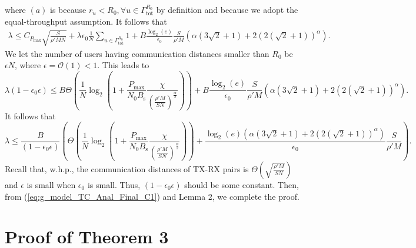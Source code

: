 \documentclass[journal,draftclsnofoot,onecolumn,12pt,twoside]{IEEEtran}
\begin{document}
where $(a)$ is because $r_u<R_0,\forall u\in\Gamma^{R_0}_{\text{tot}}$ by definition and because we adopt the equal-throughput assumption. It follows that 
\begin{equation}
\begin{aligned}
\lambda\leq C_{P_{\text{max}}}\sqrt{\frac{S}{\rho'MN}}+\lambda\epsilon_0\frac{1}{N}\sum_{u\in\Gamma^{R_0}_{\text{tot}}}1+B\frac{\log_2(e)}{\epsilon_0}\frac{S}{\rho'M}\left(\alpha\left(3\sqrt{2}+1\right)+2(2(\sqrt{2}+1))^{\alpha}\right).
\end{aligned}
\end{equation}
We let the number of users having communication distances smaller than $R_0$ be $\epsilon N$, where $\epsilon=\mathcal{O}(1)<1$. This leads to
\begin{equation}
\lambda(1-\epsilon_0\epsilon)\leq B\Theta\left(\frac{1}{N}\log_2\left(1+\frac{P_{\text{max}}}{N_0B_{\text{s}}}\frac{\chi}{\left(\frac{\rho'M}{SN}\right)^\frac{\alpha}{2}}\right)\right)+B\frac{\log_2(e)}{\epsilon_0}\frac{S}{\rho'M}\left(\alpha\left(3\sqrt{2}+1\right)+2(2(\sqrt{2}+1))^{\alpha}\right).
\end{equation}
It follows that 
\begin{equation}\label{eq:g_model_TC_Anal_Final_C1}
\lambda\leq \frac{B}{(1-\epsilon_0\epsilon)}\left(\Theta\left(\frac{1}{N}\log_2\left(1+\frac{P_{\text{max}}}{N_0B_{\text{s}}}\frac{\chi}{\left(\frac{\rho'M}{SN}\right)^\frac{\alpha}{2}}\right)\right)+\frac{\log_2(e)\left(\alpha\left(3\sqrt{2}+1\right)+2(2(\sqrt{2}+1))^{\alpha}\right)}{\epsilon_0}\frac{S}{\rho'M}\right).
\end{equation}
Recall that, w.h.p., the communication distances of TX-RX pairs is $\Theta\left(\sqrt{\frac{\rho'M}{SN}}\right)$ and $\epsilon$ is small when $\epsilon_0$ is small. Thus, $(1-\epsilon_0\epsilon)$ should be some constant. Then, from (\ref{eq:g_model_TC_Anal_Final_C1}) and Lemma 2, we complete the proof.

\section{Proof of Theorem 3}

\label{App:ProofThm3}
\end{document}
